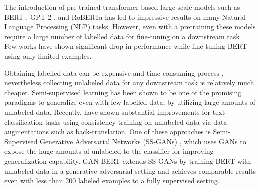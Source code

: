 \documentclass[11pt]{article}
\begin{document}
The introduction of pre-trained transformer-based large-scale models such as BERT \cite{devlin-etal-2019-bert}, GPT-2 \cite{radford2019language}, and RoBERTa \cite{liu2019roberta} has led to impressive results on many Natural Language Processing (NLP) tasks. However, even with a pretraining these models require a large number of labelled data for fine-tuning on a downstream task \cite{yogatama2019learning, croce2020gan}. Few works \cite{mukherjee2020uncertainty, croce2020gan} have shown significant drop in performance while fine-tuning BERT using only limited examples.

Obtaining labelled data can be expensive and time-consuming process \cite{dandapat-etal-2009-complex, sabou2012crowdsourcing, fort2016collaborative}, nevertheless collecting unlabeled data for any downstream task is relatively much cheaper. Semi-supervised learning \cite{kipfsemi, zhu2005semi} has been shown to be one of the promising paradigms to generalize even with few labelled data, by utilizing large amounts of unlabeled data. Recently, \citet{miyato2016adversarial, xie2020unsupervised, izmailov2020semi, liu2021flitext} have shown substantial improvements for text classification tasks using consistency training on unlabeled data via data augmentations such as back-translation. One of these approaches is Semi-Supervised Generative Adversarial Networks (SS-GANs) \cite{salimans2016improved}, which uses GANs \cite{goodfellow2014generative} to expose the huge amounts of unlabeled to the classifier for improving generalization capability. GAN-BERT \cite{croce2020gan} extends SS-GANs by training BERT with unlabeled data in a generative adversarial setting and achieves comparable results even with less than 200 labeled examples to a fully supervised setting.  


\end{document}
